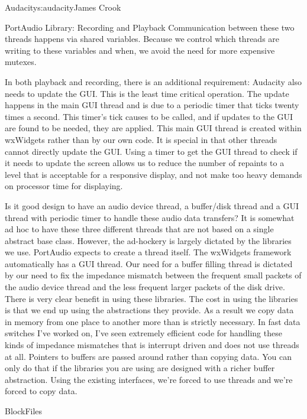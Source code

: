 \begin{aosachapter}{Audacity}{s:audacity}{James Crook}
\begin{aosasect1}{PortAudio Library: Recording and Playback}
Communication between these two threads happens via shared variables.
Because we control which threads are writing to these variables and
when, we avoid the need for more expensive mutexes.

\pagebreak

In both playback and recording, there is an additional requirement:
Audacity also needs to update the GUI\@.  This is the least time
critical operation.  The update happens in the main GUI thread and is
due to a periodic timer that ticks twenty times a second.  This
timer's tick causes  to be called, and if
updates to the GUI are found to be needed, they are applied.  This
main GUI thread is created within wxWidgets rather than by our own
code.  It is special in that other threads cannot directly update the
GUI\@.  Using a timer to get the GUI thread to check if it needs to
update the screen allows us to reduce the number of repaints to a
level that is acceptable for a responsive display, and not make too
heavy demands on processor time for displaying.

Is it good design to have an audio device thread, a buffer/disk thread
and a GUI thread with periodic timer to handle these audio data
transfers?  It is somewhat ad hoc to have these three different
threads that are not based on a single abstract base class.  However,
the ad-hockery is largely dictated by the libraries we use.  PortAudio
expects to create a thread itself.  The wxWidgets framework
automatically has a GUI thread.  Our need for a buffer filling thread
is dictated by our need to fix the impedance mismatch between the
frequent small packets of the audio device thread and the less
frequent larger packets of the disk drive.  There is very clear
benefit in using these libraries.  The cost in using the libraries is
that we end up using the abstractions they provide.  As a result we
copy data in memory from one place to another more than is strictly
necessary.  In fast data switches I've worked on, I've seen extremely
efficient code for handling these kinds of impedance mismatches
that is interrupt driven and does not use threads at all.  Pointers to
buffers are passed around rather than copying data.  You can only do
that if the libraries you are using are designed with a richer buffer
abstraction.  Using the existing interfaces, we're forced to use
threads and we're forced to copy data.

\end{aosasect1}

\begin{aosasect1}{BlockFiles}


\end{aosasect1}
\end{aosachapter}
